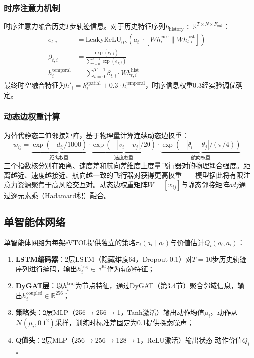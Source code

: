 \documentclass[12pt,a4paper,UTF8]{ctexart}
\begin{document}
\subsubsection{时序注意力机制}

时序注意力融合历史$T$步轨迹信息。对于历史特征序列$h_{\text{history}} \in \mathbb{R}^{T \times N \times F_{\text{out}}}$：
\begin{align}
    e_{t,i} &= \text{LeakyReLU}_{0.2}\left(a_t^{\top} \cdot [Wh_i^{\text{curr}} \parallel Wh_{t,i}^{\text{hist}}]\right) \label{eq:temporal_attn} \\
    \beta_{t,i} &= \frac{\exp(e_{t,i})}{\sum_{\tau=0}^{T-1} \exp(e_{\tau,i})} \label{eq:beta} \\
    h_i^{\text{temporal}} &= \sum_{t=0}^{T-1} \beta_{t,i} \cdot Wh_{t,i}^{\text{hist}} \label{eq:temporal_out}
\end{align}
最终时空融合特征为$h'_i = h_i^{\text{spatial}} + 0.3 \cdot h_i^{\text{temporal}}$，时序信息权重$0.3$经实验调优确定。

\subsubsection{动态边权重计算}

为替代静态二值邻接矩阵，基于物理量计算连续动态边权重：
\begin{equation}
    w_{ij} = \underbrace{\exp(-d_{ij}/1000)}_{\text{距离权重}} \cdot \underbrace{\exp(-|v_i - v_j|/20)}_{\text{速度权重}} \cdot \underbrace{\exp(-|\theta_i - \theta_j|/(\pi/4))}_{\text{航向权重}}
    \label{eq:edge_weight}
\end{equation}
三个指数核分别在距离、速度差和航向差维度上度量飞行器对的物理耦合强度。距离越近、速度越接近、航向越一致的飞行器对获得更高权重——模型据此将有限注意力资源聚焦于高风险交互对。动态边权重矩阵$W = [w_{ij}]$与静态邻接矩阵$adj$通过逐元素乘（Hadamard积）融合。

\subsection{单智能体网络}

单智能体网络为每架eVTOL提供独立的策略$\pi_i(a_i \mid o_i)$与价值估计$Q_i(o_i, a_i)$：

\begin{enumerate}[label=(\arabic*)]
    \item \textbf{LSTM编码器}：2层LSTM（隐藏维度64，Dropout 0.1）对$T=10$步历史轨迹序列进行编码，输出$h_i^{\text{traj}} \in \mathbb{R}^{64}$作为轨迹特征；
    \item \textbf{DyGAT层}：以$h_i^{\text{traj}}$为节点特征，通过DyGAT（第3.4节）聚合邻域信息，输出$h_i^{\text{coupled}} \in \mathbb{R}^{256}$；
    \item \textbf{策略头}：2层MLP（256$\to$256$\to$1，Tanh激活）输出动作均值$\mu_i$。动作从$\mathcal{N}(\mu_i, 0.1^2)$采样，训练时标准差固定为0.1提供探索噪声；
    \item \textbf{Q值头}：2层MLP（256$\to$256$\to$128$\to$1，ReLU激活）输出状态-动作价值$Q_i$。
\end{enumerate}
\end{document}
